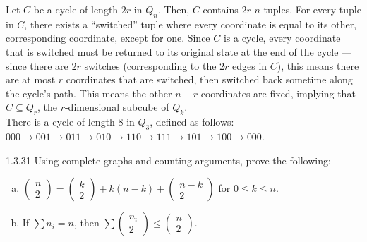 \documentclass[9pt]{extarticle}
\begin{document}
  \begin{solution}
    Let $C$ be a cycle of length $2r$ in $Q_n$. Then, $C$ contains $2r$ $n$-tuples. For every tuple in $C$, there exists a ``switched'' tuple where every coordinate is equal to its other, corresponding coordinate, except for one. Since $C$ is a cycle, every coordinate that is switched must be returned to its original state at the end of the cycle --- since there are $2r$ switches (corresponding to the $2r$ edges in $C$), this means there are at most $r$ coordinates that are switched, then switched back sometime along the cycle's path. This means the other $n-r$ coordinates are fixed, implying that $C\subseteq Q_r$, the $r$-dimensional subcube of $Q_k$.\\

    There is a cycle of length $8$ in $Q_3$, defined as follows: $000 \rightarrow 001 \rightarrow 011 \rightarrow 010 \rightarrow 110 \rightarrow 111 \rightarrow 101 \rightarrow 100 \rightarrow 000$.
  \end{solution}
  \begin{problem}{1.3.31}
    Using complete graphs and counting arguments, prove the following:
    \begin{enumerate}[(a)]
      \item $\begin{pmatrix}n\\2\end{pmatrix} = \begin{pmatrix} k\\2 \end{pmatrix} + k(n-k) + \begin{pmatrix} n-k \\ 2 \end{pmatrix}$ for $0\leq k \leq n$.
      \item If $\sum n_i = n$, then $\sum \begin{pmatrix}n_i \\ 2\end{pmatrix} \leq \begin{pmatrix}n \\ 2\end{pmatrix}$.
    \end{enumerate}
  \end{problem}
\end{document}
